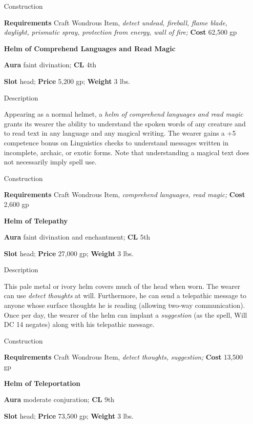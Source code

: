 Construction
				
\textbf{Requirements} Craft Wondrous Item,\textit{ detect undead, fireball, flame blade, daylight, prismatic spray, protection from energy, wall of fire;}\textbf{ Cost }62,500 gp
				
\textbf{Helm of Comprehend Languages and Read Magic}
				
\textbf{Aura} faint divination;\textbf{ CL }4th
				
\textbf{Slot} head; \textbf{Price} 5,200 gp; \textbf{Weight} 3 lbs.
				
Description
				
Appearing as a normal helmet, a \textit{helm of comprehend languages and read magic} grants its wearer the ability to understand the spoken words of any creature and to read text in any language and any magical writing. The wearer gains a +5 competence bonus on Linguistics checks to understand messages written in incomplete, archaic, or exotic forms. Note that understanding a magical text does not necessarily imply spell use. 
				
Construction
				
\textbf{Requirements} Craft Wondrous Item,\textit{ comprehend languages, read magic;}\textbf{ Cost }2,600 gp
				
\textbf{Helm of Telepathy}
				
\textbf{Aura} faint divination and enchantment;\textbf{ CL }5th
				
\textbf{Slot} head; \textbf{Price} 27,000 gp; \textbf{Weight} 3 lbs.
				
Description
				
This pale metal or ivory helm covers much of the head when worn. The wearer can use\textit{ detect thoughts }at will. Furthermore, he can send a telepathic message to anyone whose surface thoughts he is reading (allowing two-way communication). Once per day, the wearer of the helm can implant a\textit{ suggestion }(as the spell, Will DC 14 negates) along with his telepathic message. 
				
Construction
				
\textbf{Requirements} Craft Wondrous Item,\textit{ detect thoughts, suggestion;}\textbf{ Cost }13,500 gp
				
\textbf{Helm of Teleportation}
				
\textbf{Aura} moderate conjuration;\textbf{ CL }9th
				
\textbf{Slot} head; \textbf{Price} 73,500 gp; \textbf{Weight} 3 lbs.
				
